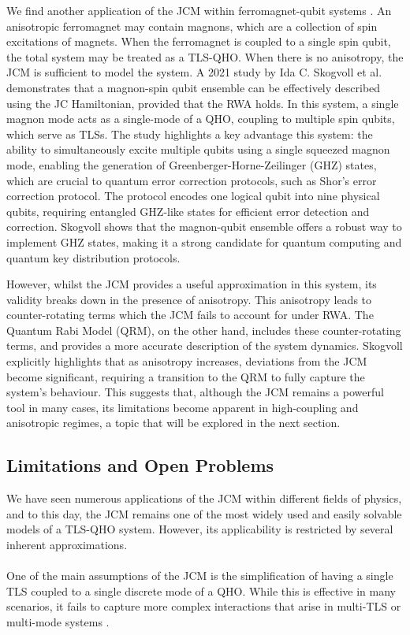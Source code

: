 \documentclass[12pt,a4paper]{article}
\begin{document}
We find another application of the JCM within ferromagnet-qubit systems \cite{General2024-JC_overview}. An anisotropic ferromagnet may contain magnons, which are a collection of spin excitations of magnets. When the ferromagnet is coupled to a single spin qubit, the total system may be treated as a TLS-QHO. When there is no anisotropy, the JCM is sufficient to model the system. A 2021 study by Ida C. Skogvoll et al. demonstrates that a magnon-spin qubit ensemble can be effectively described using the JC Hamiltonian, provided that the RWA holds. In this system, a single magnon mode acts as a single-mode of a QHO, coupling to multiple spin qubits, which serve as TLSs. The study highlights a key advantage this system: the ability to simultaneously excite multiple qubits using a single squeezed magnon mode, enabling the generation of Greenberger-Horne-Zeilinger (GHZ) states, which are crucial to quantum error correction protocols, such as Shor's error correction protocol. The protocol encodes one logical qubit into nine physical qubits, requiring entangled GHZ-like states for efficient error detection and correction. Skogvoll shows that the magnon-qubit ensemble offers a robust way to implement GHZ states, making it a strong candidate for quantum computing and quantum key distribution protocols.

However, whilst the JCM provides a useful approximation in this system, its validity breaks down in the presence of anisotropy. This anisotropy leads to counter-rotating terms which the JCM fails to account for under RWA. The Quantum Rabi Model (QRM), on the other hand, includes these counter-rotating terms, and provides a more accurate description of the system dynamics. Skogvoll explicitly highlights that as anisotropy increases, deviations from the JCM become significant, requiring a transition to the QRM to fully capture the system's behaviour. This suggests that, although the JCM remains a powerful tool in many cases, its limitations become apparent in high-coupling and anisotropic regimes, a topic that will be explored in the next section.

\subsection{Limitations and Open Problems} \label{subsec_limitations}

We have seen numerous applications of the JCM within different fields of physics, and to this day, the JCM remains one of the most widely used and easily solvable models of a TLS-QHO system. However, its applicability is restricted by several inherent approximations. \\
\\
One of the main assumptions of the JCM is the simplification of having a single TLS coupled to a single discrete mode of a QHO. While this is effective in many scenarios, it fails to capture more complex interactions that arise in multi-TLS or multi-mode systems \cite{General2024-JC_overview}.
\end{document}
